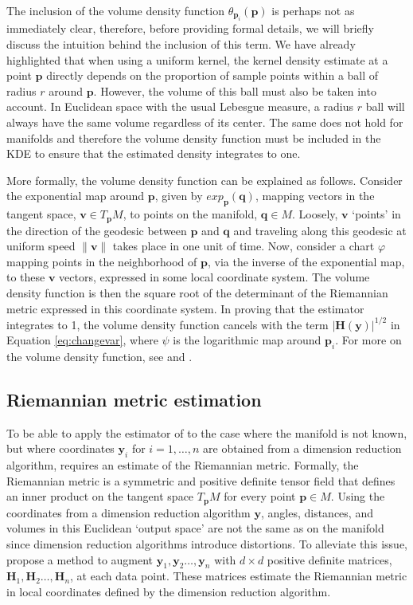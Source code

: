 \documentclass[12pt]{article}
\begin{document}
The inclusion of the volume density function \(\theta_{\bm{p}_i}(\bm{p})\) is perhaps not as immediately clear, therefore, before providing formal details, we will briefly discuss the intuition behind the inclusion of this term. We have already highlighted that when using a uniform kernel, the kernel density estimate at a point \(\bm{p}\) directly depends on the proportion of sample points within a ball of radius \(r\) around \(\bm{p}\). However, the volume of this ball must also be taken into account. In Euclidean space with the usual Lebesgue measure, a radius \(r\) ball will always have the same volume regardless of its center. The same does not hold for manifolds and therefore the volume density function must be included in the KDE to ensure that the estimated density integrates to one.

More formally, the volume density function can be explained as follows. Consider the exponential map around \(\bm{p}\), given by \(exp_{\bm{p}}(\bm{q})\), mapping vectors in the tangent space, \(\bm{v}\in T_{\bm{p}}M\), to points on the manifold, \(\bm{q}\in M\). Loosely, \(\bm{v}\) `points' in the direction of the geodesic between \(\bm{p}\) and \(\bm{q}\) and traveling along this geodesic at uniform speed \(\|\bm{v}\|\) takes place in one unit of time. Now, consider a chart \(\varphi\) mapping points in the neighborhood of \(\bm{p}\), via the inverse of the exponential map, to these \(\bm{v}\) vectors, expressed in some local coordinate system. The volume density function is then the square root of the determinant of the Riemannian metric expressed in this coordinate system. In proving that the estimator integrates to 1, the volume density function cancels with the term \(|\bm{H}(\bm{y})|^{1/2}\) in Equation \eqref{eq:changevar}, where \(\psi\) is the logarithmic map around \(\bm{p}_i\). For more on the volume density function, see \textcite{Gallot2004-rc} and \textcite{Le_Brigant2019-lj}.

\hypertarget{MetLearn}{%
\subsection{Riemannian metric estimation}\label{MetLearn}}

To be able to apply the estimator of \textcite{Pelletier2005-vu} to the case where the manifold is not known, but where coordinates \(\bm{y}_i\) for \(i=1,\dots,n\) are obtained from a dimension reduction algorithm, requires an estimate of the Riemannian metric. Formally, the Riemannian metric is a symmetric and positive definite tensor field that defines an inner product on the tangent space \(T_{\bm{p}} M\) for every point \(\bm{p} \in M\). Using the coordinates from a dimension reduction algorithm \(\bm{y}\), angles, distances, and volumes in this Euclidean `output space' are not the same as on the manifold since dimension reduction algorithms introduce distortions. To alleviate this issue, \textcite{Perrault-Joncas2013-pq} propose a method to augment \(\bm{y}_1,\bm{y}_2\dots,\bm{y}_n\) with \(d\times d\) positive definite matrices, \(\bm{H}_1,\bm{H}_2\dots,\bm{H}_n\), at each data point. These matrices estimate the Riemannian metric in local coordinates defined by the dimension reduction algorithm.
\end{document}

